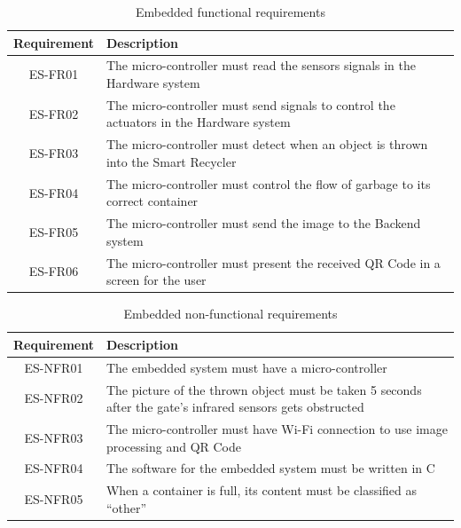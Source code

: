 \documentclass[a4paper,11pt]{article}
\begin{document}
\begin{table}[H]
  \small
  \caption{\small{Embedded functional requirements}}
  \begin{center}
    \begin{tabular}{|c|p{95mm}|}
      \hline
      Requirement & Description                                                                            \\ \hline
      ES-FR01     & The micro-controller must read the sensors signals in the Hardware system              \\ \hline
      ES-FR02     & The micro-controller must send signals to control the actuators in the Hardware system \\ \hline
      ES-FR03     & The micro-controller must detect when an object is thrown into the Smart Recycler      \\ \hline
      ES-FR04     & The micro-controller must control the flow of garbage to its correct container         \\ \hline
      ES-FR05     & The micro-controller must send the image to the Backend system                         \\ \hline
      ES-FR06     & The micro-controller must present the received QR Code in a screen for the user        \\ \hline
    \end{tabular}
  \end{center}
  \label{tab:embedded0}
\end{table}

\begin{table}[H]
  \small
  \caption{\small{Embedded non-functional requirements}}
  \begin{center}
    \begin{tabular}{|c|p{95mm}|}
      \hline
      Requirement & Description                                                                                                \\ \hline
      ES-NFR01    & The embedded system must have a micro-controller                                                           \\ \hline
      ES-NFR02    & The picture of the thrown object must be taken 5 seconds after the gate’s infrared sensors gets obstructed \\ \hline
      ES-NFR03    & The micro-controller must have Wi-Fi connection to use image processing and QR Code                        \\ \hline
      ES-NFR04    & The software for the embedded system must be written in C                                                  \\ \hline
      ES-NFR05    & When a container is full, its content must be classified as “other”                                        \\ \hline
    \end{tabular}
  \end{center}
  \label{tab:embedded1}
\end{table}
\end{document}
